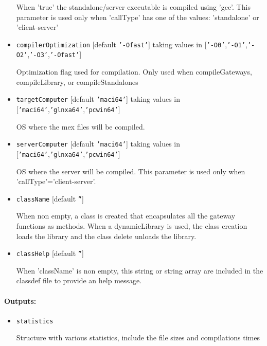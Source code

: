 \begin{itemize}
   When 'true' the standalone/server executable is compiled using 'gcc'.   
This parameter is used only when 'callType' has one of the values:   
   'standalone' or 'client-server'

\item \texttt{compilerOptimization} [default \texttt{'-Ofast'}] taking values in [\texttt{'-O0'},\texttt{'-O1'},\texttt{'-O2'},\texttt{'-O3'},\texttt{'-Ofast'}]

   Optimization flag used for compilation.   
Only used when compileGateways, compileLibrary, or compileStandalones

\item \texttt{targetComputer} [default \texttt{'maci64'}] taking values in [\texttt{'maci64'},\texttt{'glnxa64'},\texttt{'pcwin64'}]

   OS where the mex files will be compiled.

\item \texttt{serverComputer} [default \texttt{'maci64'}] taking values in [\texttt{'maci64'},\texttt{'glnxa64'},\texttt{'pcwin64'}]

   OS where the server will be compiled.   
This parameter is used only when 'callType'='client-server'.

\item \texttt{className} [default \texttt{''}]

   When non empty, a class is created that encapsulates all the   
gateway functions as methods.   
When a dynamicLibrary is used, the class creation loads the library   
and the class delete unloads the library.

\item \texttt{classHelp} [default \texttt{''}]

   When 'className' is non empty, this string or string array are   
included in the classdef file to provide an help message.

\end{itemize}

\paragraph{Outputs:}

\begin{itemize}
\item \texttt{statistics}

   Structure with various statistics, include the file sizes and compilations times
\end{itemize}


